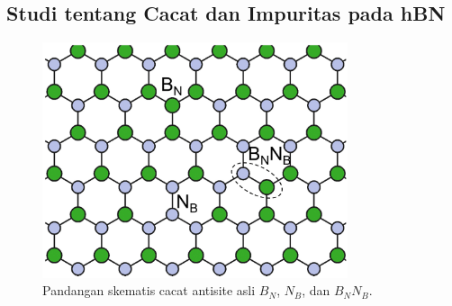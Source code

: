 \subsection{Studi tentang Cacat dan Impuritas pada hBN}

\begin{figure}[htbp]
  \centering
  \includegraphics[width=0.8\textwidth]{gambar/antisite_hBN.jpg}
  \caption{Pandangan skematis cacat antisite asli $B_N$, $N_B$, dan $B_NN_B$. \cite{song2025}}
  \label{fig:schematic_antisite_defects}
\end{figure}

